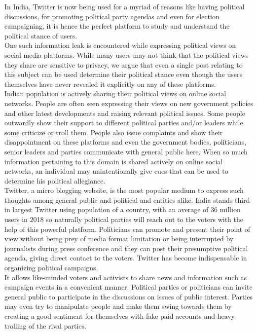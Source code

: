 \documentclass[a4paper,11pt]{article}
\begin{document}
In India, Twitter is now being used for a myriad of reasons like having  political discussions, for promoting political party agendas and even for election campaigning, it is hence the perfect platform to study and understand the political stance of users.
\medskip\\
One such information leak is encountered while expressing political views on social media platforms. While many users may not think that the political views they share are sensitive to privacy, we argue that even a single post relating to this subject can be used determine their political stance even though the users themselves have never revealed it explicitly on any of these platforms.
\medskip\\
Indian population is actively sharing their political views on online social networks. People are often seen expressing their views on new government policies and other latest developments and raising relevant political issues. Some people outwardly show their support to different political parties and/or leaders while some criticize or troll them. People also issue complaints and show their disappointment on these platforms and even the government bodies, politicians, senior leaders and parties communicate with general public here. When so much information pertaining to this domain is shared actively on online social networks, an individual may unintentionally give cues that can be used to determine his political allegiance.
\medskip\\
Twitter, a micro blogging website, is the most popular medium to express such thoughts among general public and political and entities alike. India stands third in largest Twitter using population of a country, with an average of 36 million users in 2018 so naturally political parties will reach out to the voters with the help of this powerful platform. Politicians can promote and present their point of view without being prey of media format limitation or being interrupted by journalists during press conference and they can post their presumptive political agenda, giving direct contact to the voters. Twitter has become indispensable in organizing political campaigns. 
\medskip\\
It allows like-minded voters and activists to share news and information such as campaign events in a convenient manner. Political parties or politicians can invite general public to participate in the discussions on issues of public interest. Parties may even try to manipulate people and make them swing towards them by creating a good sentiment for themselves with fake paid accounts and heavy trolling of the rival parties.
\end{document}
